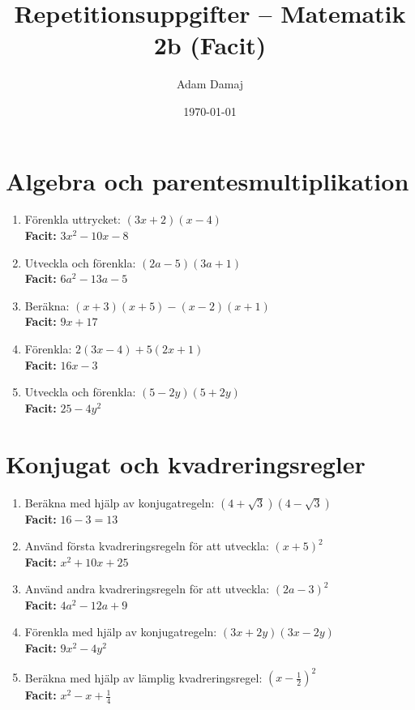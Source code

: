 \documentclass[a4paper,11pt]{article}
\title{Repetitionsuppgifter -- Matematik 2b (Facit)}
\author{Adam Damaj}
\date{\today}
\begin{document}
\maketitle

\section{Algebra och parentesmultiplikation}

\begin{enumerate}[label=\textbf{\arabic*.}]
    \item Förenkla uttrycket: $(3x + 2)(x - 4)$
    \\ \textbf{Facit:} $3x^2 - 10x - 8$
    
    \item Utveckla och förenkla: $(2a - 5)(3a + 1)$
    \\ \textbf{Facit:} $6a^2 - 13a - 5$
    
    \item Beräkna: $(x + 3)(x + 5) - (x - 2)(x + 1)$
    \\ \textbf{Facit:} $9x + 17$
    
    \item Förenkla: $2(3x - 4) + 5(2x + 1)$
    \\ \textbf{Facit:} $16x - 3$
    
    \item Utveckla och förenkla: $(5 - 2y)(5 + 2y)$
    \\ \textbf{Facit:} $25 - 4y^2$
\end{enumerate}


\section{Konjugat och kvadreringsregler}

\begin{enumerate}[label=\textbf{\arabic*.}]
    \item Beräkna med hjälp av konjugatregeln: $(4 + \sqrt{3})(4 - \sqrt{3})$
    \\ \textbf{Facit:} $16 - 3 = 13$
    
    \item Använd första kvadreringsregeln för att utveckla: $(x + 5)^2$
    \\ \textbf{Facit:} $x^2 + 10x + 25$
    
    \item Använd andra kvadreringsregeln för att utveckla: $(2a - 3)^2$
    \\ \textbf{Facit:} $4a^2 - 12a + 9$
    
    \item Förenkla med hjälp av konjugatregeln: $(3x + 2y)(3x - 2y)$
    \\ \textbf{Facit:} $9x^2 - 4y^2$
    
    \item Beräkna med hjälp av lämplig kvadreringsregel: $(x - \frac{1}{2})^2$
    \\ \textbf{Facit:} $x^2 - x + \frac{1}{4}$
\end{enumerate}
\end{document}
